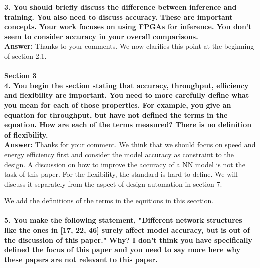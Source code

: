 \documentclass[12pt]{paper}
\newcommand{\rev}[1]{{{\color[rgb]{0,0,1}{#1}}}}
\newcommand{\answer}[1]{\noindent\textbf{Answer:} #1}
\newcommand{\comment}[1]{\noindent\textbf{#1}\\}
\begin{document}
\comment{3. You should briefly discuss the difference between inference and training. You also need to discuss accuracy. These are important concepts. Your work focuses on using FPGAs for inference. You don't seem to consider accuracy in your overall comparisons.}

\answer{Thanks to your comments. We now clarifies this point at the beginning of section 2.1. \\

\rev{In this paper, we only focus on the inference of NN, which means using a trained model to predict or classify new data. The training process of NN is not discussed in this paper.}}\\

{\noindent\textbf{Section 3}}\\

\comment{4. You begin the section stating that accuracy, throughput, efficiency and flexibility are important. You need to more carefully define what you mean for each of those properties.  For example, you give an equation for throughput, but have not defined the terms in the equation.  How are each of the terms measured? There is no definition of flexibility.}

\answer{Thanks for your comment. We think that we should focus on speed and energy efficiency first and consider the model accuracy as constraint to the design. A discussion on how to improve the accuracy of a NN model is not the task of this paper. For the flexibility, the standard is hard to define. We will discuss it separately from the aspect of design automation in section 7.

We add the definitions of the terms in the equitions in this secction. \\

\rev{Peak performance, measured in operations (multiplication or addition) per second, is achieved when all the computation units work every clock cycle. Utilization denotes the average ratio of working cycles of the computation units. The workload measures the number of operations in the target neural network.}}\\

\comment{5. You make the following statement, "Different network structures like the ones in [17, 22, 46] surely affect model accuracy, but is out of the discussion of this paper." Why? I don't think you have specifically defined the focus of this paper and you need to say more here why these papers are not relevant to this paper.}
\end{document}
